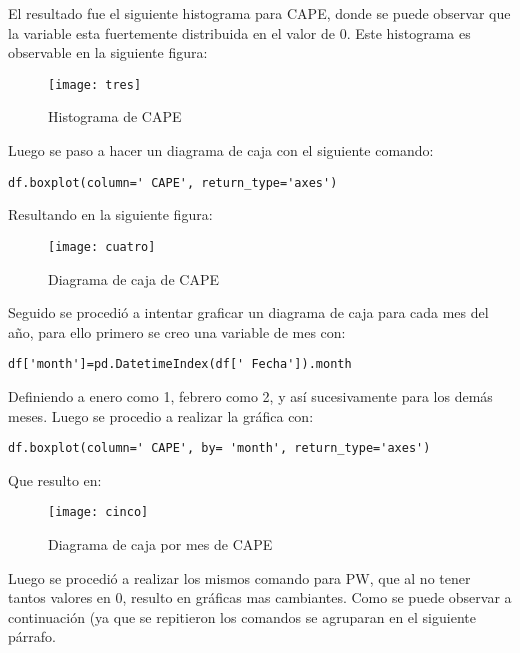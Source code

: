 \documentclass[12pt,letterpaper]{article}
\begin{document}
El resultado fue el siguiente histograma para CAPE, donde se puede observar que la variable esta fuertemente distribuida en el valor de 0. Este histograma es observable en la siguiente figura:

\begin{figure}[H]
\begin{center}
\texttt{[image: tres]}
\end{center}
\caption{Histograma de CAPE}
\end{figure}

Luego se paso a hacer un diagrama de caja con el siguiente comando:


\begin{verbatim}
df.boxplot(column=' CAPE', return_type='axes')
\end{verbatim}

Resultando en la siguiente figura:

\begin{figure}[H]
\begin{center}
\texttt{[image: cuatro]}
\end{center}
\caption{Diagrama de caja de CAPE}
\end{figure}

Seguido se procedió a intentar graficar un diagrama de caja para cada mes del año, para ello primero se creo una variable de mes con:

\begin{verbatim}
df['month']=pd.DatetimeIndex(df[' Fecha']).month
\end{verbatim}

Definiendo a enero como 1, febrero como 2, y así sucesivamente para los demás meses. Luego se procedio a realizar la gráfica con:

\begin{verbatim}
df.boxplot(column=' CAPE', by= 'month', return_type='axes')
\end{verbatim}

Que resulto en:

\begin{figure}[H]
\begin{center}
\texttt{[image: cinco]}
\end{center}
\caption{Diagrama de caja por mes de CAPE}
\end{figure}

Luego se procedió a realizar los mismos comando para PW, que al no tener tantos valores en 0, resulto en gráficas mas cambiantes. Como se puede observar a continuación (ya que se repitieron los comandos se agruparan en el siguiente párrafo.
\end{document}
